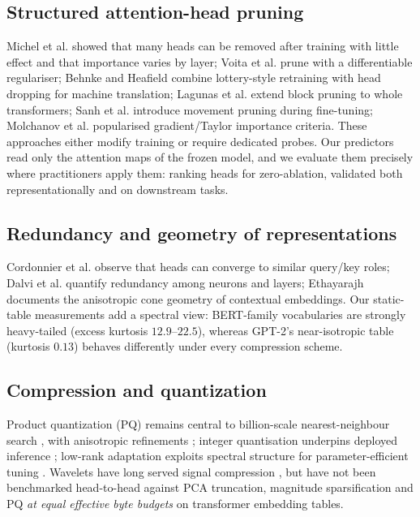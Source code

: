 \documentclass[conference]{IEEEtran}
\begin{document}
\subsection{Structured attention-head pruning}
Michel et al. \cite{michel2019} showed that many heads can be removed
after training with little effect and that importance varies by layer;
Voita et al. \cite{voita2019} prune with a differentiable regulariser;
Behnke and Heafield \cite{behnke2021} combine lottery-style retraining
with head dropping for machine translation; Lagunas et al.
\cite{lagunas2021} extend block pruning to whole transformers; Sanh et
al. \cite{sanh2020movement} introduce movement pruning during
fine-tuning; Molchanov et al. \cite{molchanov2017} popularised
gradient/Taylor importance criteria. These approaches either modify
training or require dedicated probes. Our predictors read only the
attention maps of the frozen model, and we evaluate them precisely where
practitioners apply them: ranking heads for zero-ablation, validated
both representationally and on downstream tasks.

\subsection{Redundancy and geometry of representations}
Cordonnier et al. \cite{cordonnier2019} observe that heads can converge
to similar query/key roles; Dalvi et al. \cite{dalvi2020} quantify
redundancy among neurons and layers; Ethayarajh \cite{ethayarajh2019}
documents the anisotropic cone geometry of contextual embeddings. Our
static-table measurements add a spectral view: BERT-family vocabularies
are strongly heavy-tailed (excess kurtosis $12.9$--$22.5$), whereas
GPT-2's near-isotropic table (kurtosis $0.13$) behaves differently under
every compression scheme.

\subsection{Compression and quantization}
Product quantization (PQ) \cite{jegou2011} remains central to
billion-scale nearest-neighbour search \cite{johnson2019}, with anisotropic
refinements \cite{guo2020opq}; integer quantisation underpins deployed
inference \cite{jacob2018,dettmers2022}; low-rank adaptation exploits
spectral structure for parameter-efficient tuning \cite{hu2021lora}.
Wavelets have long served signal compression \cite{mallat1989,
daubechies1992}, but have not been benchmarked head-to-head against PCA
truncation, magnitude sparsification and PQ \emph{at equal effective
byte budgets} on transformer embedding tables.
\end{document}
